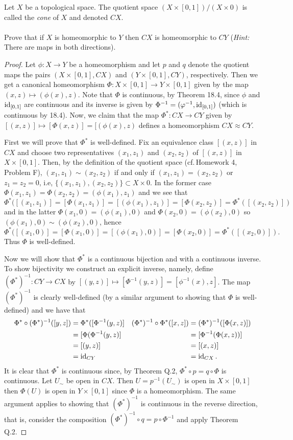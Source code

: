 \newpage
\begin{problem}[A]
Let $X$ be a topological space. The quotient space
$(X\times[0,1])/(X\times 0)$ is called the \emph{cone} of $X$ and
denoted $CX$.
\\\\
Prove that if $X$ is homeomorphic to $Y$ then $CX$ is
homeomorphic to $CY$ (\emph{Hint:} There are maps in both
directions).
\end{problem}
\begin{proof}
Let $\phi\colon X\to Y$ be a homeomorphism and let $p$ and $q$
denote the quotient maps the pairs $(X\times[0,1],CX)$ and
$(Y\times[0,1],CY)$, respectively. Then we get a canonical
homeomorphism $\Phi\colon X\times[0,1]\to Y\times[0,1]$ given by
the map $(x,z)\mapsto (\phi(x),z)$. Note that $\Phi$ is
continuous, by Theorem 18.4, since $\phi$ and $\operatorname{id}_{[0,1]}$ are
continuous and its inverse is given by
$\Phi^{-1}=(\varphi^{-1},\operatorname{id}_{[0,1]})$ (which is continuous by
18.4). Now, we claim that the map $\Phi^*\colon CX\to CY$ given
by $[(x,z)]\mapsto[\Phi(x,z)]=[(\phi(x),z)$ defines a
homeomorphism $CX\approx CY$.

First we will prove that $\Phi^*$ is well-defined. Fix an
equivalence class $[(x,z)]$ in $CX$ and choose two
representatives $(x_1,z_1)$ and $(x_2,z_2)$ of $[(x,z)]$ in
$X\times[0,1]$. Then, by the definition of the quotient space
(cf.\,Homework 4, Problem F), $(x_1,z_1)\sim(x_2,z_2)$ if and
only if $(x_1,z_1)=(x_2,z_2)$ or $z_1=z_2=0$, i.e,
$\{(x_1,z_1),(x_2,z_2)\}\subset X\times 0$. In the former case
$\Phi(x_1,z_1)=\Phi(x_2,z_2)=(\phi(x_1),z_1)$ and we see that
\[
\Phi^*([(x_1,z_1)]=[\Phi(x_1,z_1)]=[(\phi(x_1),z_1)]=[\Phi(x_2,z_2)]=\Phi^*([(x_2,z_2)])
\]
and in the latter $\Phi(x_1,0)=(\phi(x_1),0)$ and
$\Phi(x_2,0)=(\phi(x_2),0)$ so $(\phi(x_1),0)\sim(\phi(x_2),0)$, hence
\[
\Phi^*([(x_1,0)]=[\Phi(x_1,0)]=[(\phi(x_1),0)]=[\Phi(x_2,0)]=\Phi^*([(x_2,0)]).
\]
Thus $\Phi$ is well-defined.

Now we will show that $\Phi^*$ is a continuous bijection and with
a continuous inverse. To show bijectivity we construct an
explicit inverse, namely, define $(\Phi^*)^{-1}\colon CY\to CX$
by $[(y,z)]\mapsto[\Phi^{-1}(y,z)]=[\phi^{-1}(x),z]$. The map
$(\Phi^*)^{-1}$ is clearly well-defined (by a similar argument to
showing that $\Phi$ is well-defined) and we have that
\begin{align*}
\Phi^*\circ(\Phi^*)^{-1}([y,z])
&=\Phi^*([\Phi^{-1}(y,z)]
&
(\Phi^*)^{-1}\circ\Phi^*([x,z])
&=(\Phi^*)^{-1}([\Phi(x,z)])
\\
&=[\Phi(\Phi^{-1}(y,z)]
&
&=[\Phi^{-1}(\Phi(x,z))]
\\
&=[(y,z)]
&
&=[(x,z)]\\
&=\operatorname{id}_{CY}
&&=\operatorname{id}_{CX}.
\end{align*}
It is clear that $\Phi^*$ is continuous since, by Theorem Q.2,
$\Phi^*\circ p=q\circ\Phi$ is continuous. Let $U_\sim$ be open in
$CX$. Then $U=p^{-1}(U_\sim)$ is open in $X\times[0,1]$ then
$\Phi(U)$ is open in $Y\times[0,1]$ since $\Phi$ is a
homeomorphism. The same argument applies to showing that
$(\Phi^*)^{-1}$ is continuous in the reverse direction, that is,
consider the composition $(\Phi^*)^{-1}\circ q=p\circ\Phi^{-1}$
and apply Theorem Q.2.
\end{proof}

